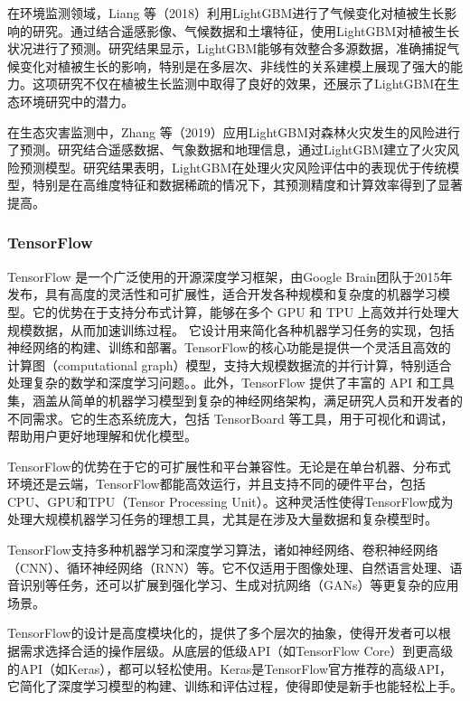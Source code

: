 \documentclass{article}
\begin{document}
	在环境监测领域，Liang 等（2018）利用LightGBM进行了气候变化对植被生长影响的研究\cite{liang2018}。通过结合遥感影像、气候数据和土壤特征，使用LightGBM对植被生长状况进行了预测。研究结果显示，LightGBM能够有效整合多源数据，准确捕捉气候变化对植被生长的影响，特别是在多层次、非线性的关系建模上展现了强大的能力。这项研究不仅在植被生长监测中取得了良好的效果，还展示了LightGBM在生态环境研究中的潜力。
	
	在生态灾害监测中，Zhang 等（2019）应用LightGBM对森林火灾发生的风险进行了预测\cite{zhang2019}。研究结合遥感数据、气象数据和地理信息，通过LightGBM建立了火灾风险预测模型。研究结果表明，LightGBM在处理火灾风险评估中的表现优于传统模型，特别是在高维度特征和数据稀疏的情况下，其预测精度和计算效率得到了显著提高。
	
	
	\subsubsection{TensorFlow}
	
	TensorFlow 是一个广泛使用的开源深度学习框架，由Google Brain团队于2015年发布，具有高度的灵活性和可扩展性，适合开发各种规模和复杂度的机器学习模型。它的优势在于支持分布式计算，能够在多个 GPU 和 TPU 上高效并行处理大规模数据，从而加速训练过程。
	它设计用来简化各种机器学习任务的实现，包括神经网络的构建、训练和部署。TensorFlow的核心功能是提供一个灵活且高效的计算图（computational graph）模型，支持大规模数据流的并行计算，特别适合处理复杂的数学和深度学习问题。。此外，TensorFlow 提供了丰富的 API 和工具集，涵盖从简单的机器学习模型到复杂的神经网络架构，满足研究人员和开发者的不同需求。它的生态系统庞大，包括 TensorBoard 等工具，用于可视化和调试，帮助用户更好地理解和优化模型。
		
	TensorFlow的优势在于它的可扩展性和平台兼容性。无论是在单台机器、分布式环境还是云端，TensorFlow都能高效运行，并且支持不同的硬件平台，包括CPU、GPU和TPU（Tensor Processing Unit）。这种灵活性使得TensorFlow成为处理大规模机器学习任务的理想工具，尤其是在涉及大量数据和复杂模型时。
	
	TensorFlow支持多种机器学习和深度学习算法，诸如神经网络、卷积神经网络（CNN）、循环神经网络（RNN）等。它不仅适用于图像处理、自然语言处理、语音识别等任务，还可以扩展到强化学习、生成对抗网络（GANs）等更复杂的应用场景。
	
	TensorFlow的设计是高度模块化的，提供了多个层次的抽象，使得开发者可以根据需求选择合适的操作层级。从底层的低级API（如TensorFlow Core）到更高级的API（如Keras），都可以轻松使用。Keras是TensorFlow官方推荐的高级API，它简化了深度学习模型的构建、训练和评估过程，使得即使是新手也能轻松上手。
	
\end{document}
